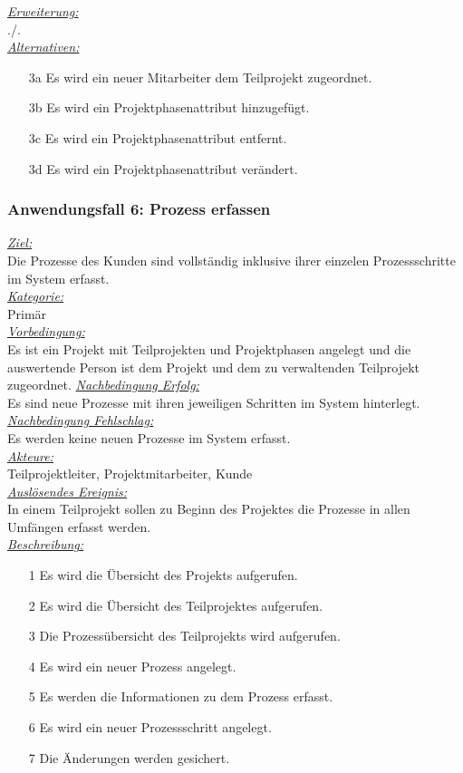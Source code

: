 \underline{\emph{Erweiterung:}}\\
./.\\
\underline{\emph{Alternativen:}}\\
\begin{itemize}
    \item [3a] Es wird ein neuer Mitarbeiter dem Teilprojekt zugeordnet.
    \item [3b] Es wird ein Projektphasenattribut hinzugefügt. 
    \item [3c] Es wird ein Projektphasenattribut entfernt.
    \item [3d] Es wird ein Projektphasenattribut verändert.
\end{itemize}

\subsubsection{Anwendungsfall 6: Prozess erfassen}
\underline{\emph{Ziel:}}\\
Die Prozesse des Kunden sind vollständig inklusive ihrer einzelen Prozessschritte im System erfasst.\\
\underline{\emph{Kategorie:}} \\
Primär\\
\underline{\emph{Vorbedingung:}} \\
Es ist ein Projekt mit Teilprojekten und Projektphasen angelegt und die auswertende Person ist dem Projekt und dem zu verwaltenden Teilprojekt zugeordnet.
\underline{\emph{Nachbedingung Erfolg:}} \\
Es sind neue Prozesse mit ihren jeweiligen Schritten im System hinterlegt.\\
\underline{\emph{Nachbedingung Fehlschlag:}} \\
Es werden keine neuen Prozesse im System erfasst.\\
\underline{\emph{Akteure:}} \\
Teilprojektleiter, Projektmitarbeiter, Kunde\\
\underline{\emph{Auslösendes Ereignis:}} \\
In einem Teilprojekt sollen zu Beginn des Projektes die Prozesse in allen Umfängen erfasst werden.\\
\underline{\emph{Beschreibung:}}
\begin{itemize}
    \item [1] Es wird die Übersicht des Projekts aufgerufen.
    \item [2] Es wird die Übersicht des Teilprojektes aufgerufen.
    \item [3] Die Prozessübersicht des Teilprojekts wird aufgerufen.
    \item [4] Es wird ein neuer Prozess angelegt.
    \item [5] Es werden die Informationen zu dem Prozess erfasst.
    \item [6] Es wird ein neuer Prozessschritt angelegt.
    \item [7] Die Änderungen werden gesichert.
\end{itemize}

